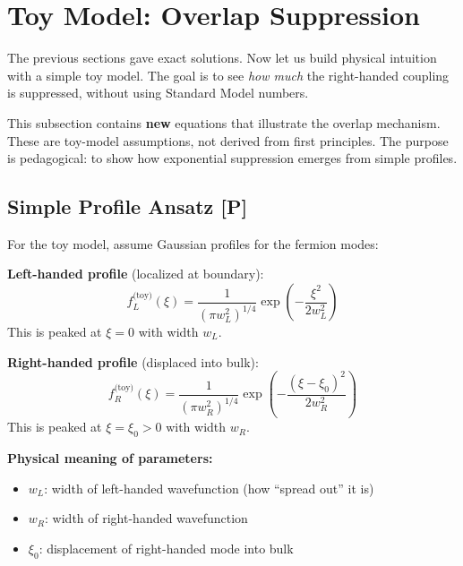 \section{Toy Model: Overlap Suppression}
\label{sec:ch9_toy_model}

The previous sections gave exact solutions. Now let us build physical intuition
with a simple toy model. The goal is to see \emph{how much} the right-handed
coupling is suppressed, without using Standard Model numbers.

\begin{tcolorbox}[colback=gray!5, colframe=gray!50!black,
    title=\textbf{Toy Model Disclaimer}]
This subsection contains \textbf{new} equations that illustrate the overlap
mechanism. These are \tagP{} toy-model assumptions, not derived from first
principles. The purpose is pedagogical: to show how exponential suppression
emerges from simple profiles.
\end{tcolorbox}

\subsection{Simple Profile Ansatz [P]}

For the toy model, assume Gaussian profiles for the fermion modes:

\textbf{Left-handed profile} (localized at boundary):
\begin{equation}
    f_L^{\text{(toy)}}(\xi) = \frac{1}{(\pi w_L^2)^{1/4}} \exp\left(-\frac{\xi^2}{2w_L^2}\right)
    \label{eq:ch9_toy_fL}
\end{equation}
This is peaked at $\xi = 0$ with width $w_L$.

\textbf{Right-handed profile} (displaced into bulk):
\begin{equation}
    f_R^{\text{(toy)}}(\xi) = \frac{1}{(\pi w_R^2)^{1/4}} \exp\left(-\frac{(\xi - \xi_0)^2}{2w_R^2}\right)
    \label{eq:ch9_toy_fR}
\end{equation}
This is peaked at $\xi = \xi_0 > 0$ with width $w_R$.

\textbf{Physical meaning of parameters:}
\begin{itemize}[nosep]
    \item $w_L$: width of left-handed wavefunction (how ``spread out'' it is)
    \item $w_R$: width of right-handed wavefunction
    \item $\xi_0$: displacement of right-handed mode into bulk
\end{itemize}

